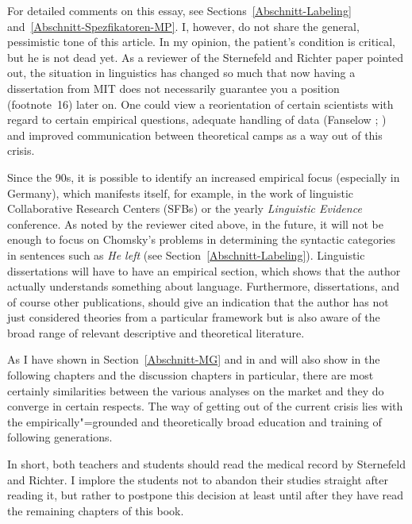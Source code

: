 {{  For detailed comments on this essay, see Sections~\ref{Abschnitt-Labeling} and~\ref{Abschnitt-Spezfikatoren-MP}.
}
I, however, do not share the general, pessimistic tone of this article. In my opinion, the patient's condition is critical, but he is not dead yet.
As a reviewer of the Sternefeld and Richter paper pointed out, the situation in linguistics has changed so much that now having a dissertation from 
MIT does not necessarily guarantee you a position (footnote~16) later on. One could view a reorientation of certain scientists with regard to certain empirical
questions, adequate handling of data (Fanselow \citeyear{Fanselow2004b}; \citeyear[]{Fanselow2009a}) and improved communication between
theoretical camps as a way out of this crisis.

Since the 90s, it is possible to identify an increased empirical focus (especially in Germany),
which manifests itself, for example, in the work of linguistic Collaborative Research Centers (SFBs)
or the yearly \emph{Linguistic Evidence} conference. As noted by the reviewer cited above, in the
future, it will not be enough to focus on Chomsky's problems in determining the syntactic categories
in sentences such as \emph{He left} (see
Section~\ref{Abschnitt-Labeling}). Linguistic dissertations will have to have an empirical section, which shows that the author actually understands
something about language. Furthermore, dissertations, and of course other publications, should give an indication that the author has not just
considered theories from a particular framework but is also aware of the broad range of relevant descriptive and theoretical literature.

As I have shown in Section~\ref{Abschnitt-MG} and in  and will also show in
the following chapters and the discussion chapters in particular, there are most certainly similarities between the various analyses on the market 
and they do converge in certain respects. The way of getting out of the current crisis lies with the
empirically"=grounded and theoretically broad education and training of following generations.

In short, both teachers and students should read the medical record by Sternefeld and Richter. I implore the students not to abandon their studies straight
after reading it, but rather to postpone this decision at least until after they have read the remaining chapters of this book.
}

